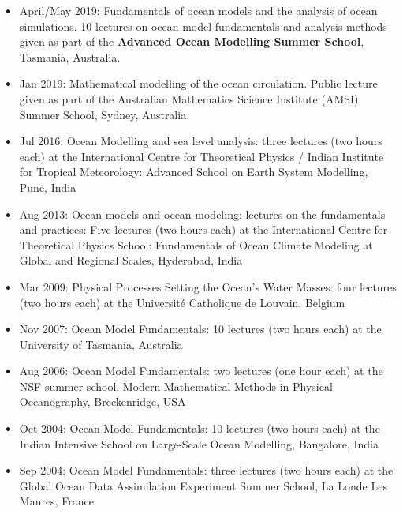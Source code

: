 \documentclass{article}
\begin{document}
\begin{itemize}[leftmargin=*]

\item April/May 2019: {\sc Fundamentals of ocean models and the analysis of ocean simulations}.
10 lectures on ocean model fundamentals and analysis methods given as part of the {\bf Advanced Ocean Modelling Summer School}, Tasmania, Australia. 

\item Jan 2019: {\sc Mathematical modelling of the ocean circulation}. Public lecture given as part of the Australian Mathematics Science Institute (AMSI) Summer School, Sydney, Australia. 

\item Jul 2016: {\sc Ocean Modelling and sea level analysis}: three lectures (two hours each) at the International Centre for Theoretical Physics / Indian Institute for Tropical Meteorology: {\sc Advanced School on Earth System Modelling}, Pune, India

\item Aug 2013: {\sc Ocean models and ocean modeling: lectures on the fundamentals and practices}: Five lectures (two hours each) at the International Centre for Theoretical Physics School: {\sc Fundamentals of Ocean Climate Modeling at Global and Regional Scales}, Hyderabad, India

\item Mar 2009: {\sc Physical Processes Setting the Ocean's Water Masses}: four lectures (two hours each) at the Universit\'e Catholique de Louvain, Belgium

\item Nov 2007: {\sc Ocean Model Fundamentals}: 10 lectures (two hours each) at the University of Tasmania, Australia 

\item Aug 2006: {\sc Ocean Model Fundamentals}: two lectures (one hour each) at the NSF summer school, {\sc Modern Mathematical Methods in
Physical Oceanography}, Breckenridge, USA

\item Oct 2004: {\sc Ocean Model Fundamentals}: 10 lectures (two hours each) at the {\sc Indian Intensive School on Large-Scale Ocean Modelling}, Bangalore, India

\item Sep 2004: {\sc Ocean Model Fundamentals}: three lectures (two hours each) at the {\sc Global Ocean Data Assimilation Experiment  Summer School}, La Londe Les Maures, France


\end{itemize}
\end{document}
